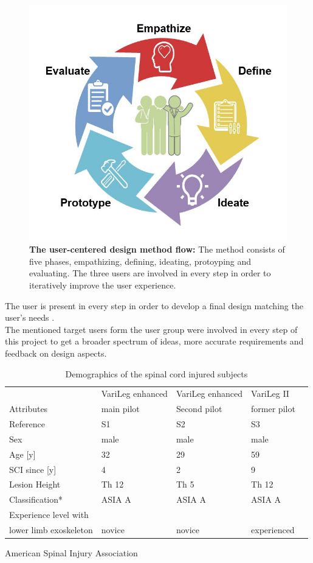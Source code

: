 \documentclass[conference,a4paper]{IEEEtran}
\begin{document}
\begin{figure}[!t]
	\centering
	\includegraphics[width=0.75\columnwidth]{Images/Methods/ucd_flow.jpg}
	\caption{\textbf{The user-centered design method flow:} The method consists of five phases, empathizing, defining, ideating, protoyping and evaluating. The three users are involved in every step in order to iteratively improve the user experience.}
	\label{ucdflow}
\end{figure}
The user is present in every step in order to develop a final design matching the user’s needs \cite{buurmann1997}. \\
The mentioned target users form the user group were involved in every step of this project to get a broader spectrum of ideas, more accurate requirements and feedback on design aspects.

\begin{table}[bt]
\caption{Demographics of the spinal cord injured subjects}
\label{tab:specs_sci}
	\centering
	\begin{tabular}{lllll}
	    \hline
		& VariLeg enhanced & VariLeg enhanced & VariLeg II \\
		Attributes  & main pilot & Second pilot  & former pilot\\
		Reference & S1 & S2 & S3\\
		\hline
		Sex & male & male & male \\
		Age [y] & 32 & 29 & 59\\
		SCI since [y]  & 4 & 2 & 9 \\
		Lesion Height & Th 12& Th 5 & Th 12\\
		Classification* & ASIA A& ASIA A& ASIA A \\
		Experience level with\\ lower limb exoskeleton & novice & novice & experienced\\
		\hline
	\end{tabular}
\begin{tablenotes}
\centering \item *American Spinal Injury Association \cite{ASIA}
\end{tablenotes}
\end{table}
\end{document}
